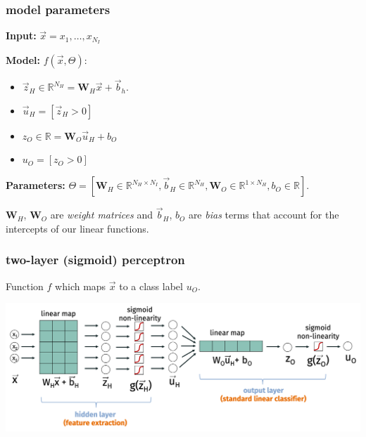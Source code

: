 \documentclass[handout,compress]{beamer}
\newcommand{\bv}[1]{\mathbf{#1}}
\newcommand{\R}{\mathbb{R}}
\begin{document}
\begin{frame}
	\frametitle{model parameters}
	\textbf{Input:} $\vec{x} = x_1, \ldots, x_{N_I}$
	
	\textbf{Model:} $f(\vec{x}, \Theta)$:
	\begin{itemize}
		\item $\vec{z}_H\in \R^{N_H} = \bv{W}_H\vec{x} + \vec{b}_h$.
		\item $\vec{u}_H = [\vec{z}_H > 0]$ 
		\item $z_O \in \R = \bv{W}_O\vec{u}_H + b_O$
		\item ${u}_O = [{z}_O > 0]$
	\end{itemize}

	\textbf{Parameters:} $\Theta = [\bv{W}_H\in \R^{N_H\times N_I}, \vec{b}_H\in \R^{N_H} , \bv{W}_O\in \R^{1\times N_H}, {b}_O\in \R]$.
	
	\begin{center}
		$\bv{W}_H$, $\bv{W}_O$ are \emph{weight matrices} and $\vec{b}_H$, ${b}_O$ are \emph{bias} terms that account for the intercepts of our linear functions.  
	\end{center}
\end{frame}

\begin{frame}
	\frametitle{two-layer (sigmoid) perceptron}
	Function $f$ which maps $\vec{x}$ to a class label $u_O$.

	\begin{center}
		\includegraphics[width=\textwidth]{neural_net_arch.png}
	\end{center}	
\end{frame}
\end{document}
